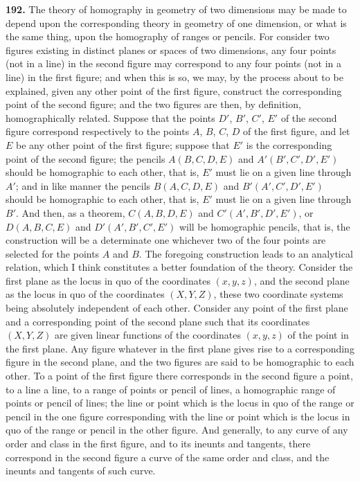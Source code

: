\documentclass[11pt,a4paper]{book}
\begin{document}
\begin{center}
\textbf{192.} The theory of homography in geometry of two dimensions may be made to
depend upon the corresponding theory in geometry of one dimension, or what is the
same thing, upon the homography of ranges or pencils. For consider two figures existing
in distinct planes or spaces of two dimensions, any four points (not in a line) in the
second figure may correspond to any four points (not in a line) in the first figure; and
when this is so, we may, by the process about to be explained, given any other point
of the first figure, construct the corresponding point of the second figure; and the
two figures are then, by definition, homographically related. Suppose that the points
$D'$, $B'$, $C'$, $E'$ of the second figure correspond respectively to the points $A$, $B$, $C$, $D$ of
the first figure, and let $E$ be any other point of the first figure; suppose that $E'$ is the
corresponding point of the second figure; the pencils $A(B,C,D,E)$ and $A'(B',C',D',E')$
should be homographic to each other, that is, $E'$ must lie on a given line through $A'$;
and in like manner the pencils $B(A,C,D,E)$ and $B'(A',C',D',E')$ should be homographic
to each other, that is, $E'$ must lie on a given line through $B'$. And then, as a theorem,
$C(A,B,D,E)$ and $C'(A',B',D',E')$, or $D(A,B,C,E)$ and $D'(A',B',C',E')$ will be homographic
pencils, that is, the construction will be a determinate one whichever two of the four
points are selected for the points $A$ and $B$. The foregoing construction leads to an
analytical relation, which I think constitutes a better foundation of the theory. Consider
the first plane as the locus in quo of the coordinates $(x,y,z)$, and the second plane as
the locus in quo of the coordinates $(X,Y,Z)$, these two coordinate systems being
absolutely independent of each other. Consider any point of the first plane and a
corresponding point of the second plane such that its coordinates $(X,Y,Z)$ are given
linear functions of the coordinates $(x,y,z)$ of the point in the first plane. Any figure
whatever in the first plane gives rise to a corresponding figure in the second plane, and
the two figures are said to be homographic to each other. To a point of the first figure
there corresponds in the second figure a point, to a line a line, to a range of points or
pencil of lines, a homographic range of points or pencil of lines; the line or point which
is the locus in quo of the range or pencil in the one figure corresponding with the line
or point which is the locus in quo of the range or pencil in the other figure. And
generally, to any curve of any order and class in the first figure, and to its ineunts and
tangents, there correspond in the second figure a curve of the same order and class, and
the ineunts and tangents of such curve.


\end{center}
\end{document}
